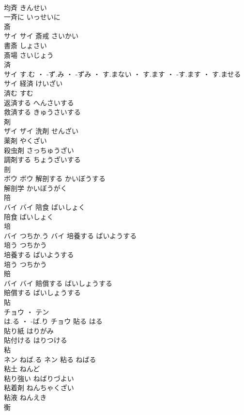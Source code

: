 \documentclass[8pt]{extreport}
\begin{document}
\begin{CJK}{UTF8}{min}
\\	均斉	きんせい	
\\	一斉に	いっせいに	
\\	斎	
\\	サイ		サイ	斎戒	さいかい	
\\	書斎	しょさい	
\\	斎場	さいじょう	
\\	済	
\\	サイ	す.む ・ -ず.み ・ -ずみ ・ す.まない ・ す.ます ・ -す.ます ・ す.ませる	サイ	経済	けいざい	
\\	済む	すむ	
\\	返済する	へんさいする	
\\	救済する	きゅうさいする	
\\	剤	
\\	ザイ		ザイ	洗剤	せんざい	
\\	薬剤	やくざい	
\\	殺虫剤	さっちゅうざい	
\\	調剤する	ちょうざいする	
\\	剖	
\\	ボウ		ボウ	解剖する	かいぼうする	
\\	解剖学	かいぼうがく	
\\	陪	
\\	バイ		バイ	陪食	ばいしょく	
\\	陪食	ばいしょく	
\\	培	
\\	バイ	つちか.う	バイ	培養する	ばいようする	
\\	培う	つちかう	
\\	培養する	ばいようする	
\\	培う	つちかう	
\\	賠	
\\	バイ		バイ	賠償する	ばいしょうする	
\\	賠償する	ばいしょうする	
\\	貼	
\\	チョウ ・ テン
\\	は.る ・ -ば.り	チョウ	貼る	はる	
\\	貼り紙	はりがみ	
\\	貼付ける	はりつける	
\\	粘	
\\	ネン	ねば.る	ネン	粘る	ねばる	
\\	粘土	ねんど	
\\	粘り強い	ねばりづよい	
\\	粘着剤	ねんちゃくざい	
\\	粘液	ねんえき	
\\	衡	

\end{CJK}
\end{document}
